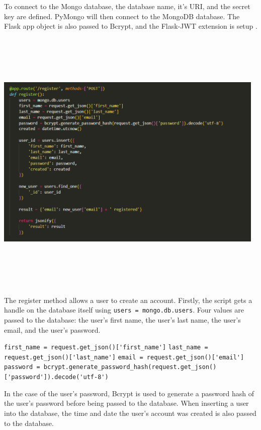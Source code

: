 \newpage
To connect to the Mongo database, the database name, it's URI, and the secret key are defined. PyMongo will then connect to the MongoDB database. The Flask app object is also passed to Bcrypt, and the Flask-JWT extension is setup \cite{mlab_docs}.

\begin{center}
    \includegraphics[width=13cm,height=13cm,keepaspectratio]{images/backend2}
\end{center}
The register method allows a user to create an account. Firstly, the script gets a handle on the database itself using \lstinline{users = mongo.db.users}. Four values are passed to the database: the user's first name, the user's last name, the user's email, and the user's password. 

\medskip
\lstinline{first_name = request.get_json()['first_name']}
\newline
\lstinline{last_name = request.get_json()['last_name']}
\newline
\lstinline{email = request.get_json()['email']}
\newline
\lstinline{password = bcrypt.generate_password_hash(request.get_json()['password']).decode('utf-8')}

\bigskip
In the case of the user's password, Bcrypt is used to generate a password hash of the user's password before being passed to the database. When inserting a user into the database, the time and date the user's account was created is also passed to the database.

